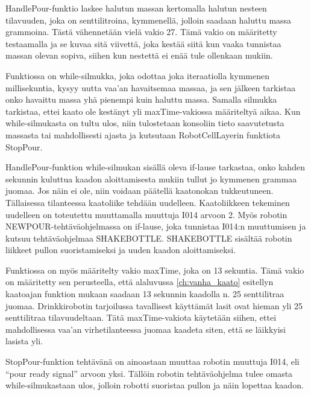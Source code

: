 HandlePour\hyp{}funktio laskee halutun massan kertomalla halutun nesteen tilavuuden, joka on senttilitroina, kymmenellä, jolloin saadaan haluttu massa grammoina. Tästä vähennetään vielä vakio 27. Tämä vakio on määritetty testaamalla ja se kuvaa sitä viivettä, joka kestää siitä kun vaaka tunnistaa massan olevan sopiva, siihen kun nestettä ei enää tule ollenkaan mukiin.

Funktiossa on while-silmukka, joka odottaa joka iteraatiolla kymmenen millisekuntia, kysyy uutta vaa'an havaitsemaa massaa, ja sen jälkeen tarkistaa onko havaittu massa yhä pienempi kuin haluttu massa. Samalla silmukka tarkistaa, ettei kaato ole kestänyt yli maxTime-vakiossa määriteltyä aikaa. Kun while-silmukasta on tultu ulos, niin tulostetaan konsoliin tieto saavutetusta massasta tai mahdollisesti ajasta ja kutsutaan RobotCellLayerin funktiota StopPour.

HandlePour-funktion while-silmukan sisällä oleva if-lause tarkastaa, onko kahden sekunnin kuluttua kaadon aloittamisesta mukiin tullut jo kymmenen grammaa juomaa. Jos näin ei ole, niin voidaan päätellä kaatonokan tukkeutuneen. Tällaisessa tilanteessa kaatoliike tehdään uudelleen. Kaatoliikkeen tekeminen uudelleen on toteutettu muuttamalla muuttuja I014 arvoon 2. Myös robotin NEWPOUR-tehtäväohjelmassa on if-lause, joka tunnistaa I014:n muuttumisen ja kutsuu tehtäväohjelmaa SHAKEBOTTLE. SHAKEBOTTLE sisältää robotin liikkeet pullon suoristamiseksi ja uuden kaadon aloittamiseksi.

Funktiossa on myös määritelty vakio maxTime, joka on 13 sekuntia. Tämä vakio on määritetty sen perusteella, että alaluvussa \ref{ch:vanha_kaato} esitellyn kaatoajan funktion mukaan saadaan 13 sekunnin kaadolla n. 25 senttilitraa juomaa. Drinkkirobotin tarjoilussa tavallisest käyttämät lasit ovat hieman yli 25 senttilitraa tilavuudeltaan. Tätä maxTime-vakiota käytetään siihen, ettei mahdollisessa vaa'an virhetilanteessa juomaa kaadeta siten, että se läikkyisi lasista yli.

StopPour-funktion tehtävänä on ainoastaan muuttaa robotin muuttuja I014, eli ``pour ready signal'' arvoon yksi. Tällöin robotin tehtäväohjelma tulee omasta while-silmukastaan ulos, jolloin robotti suoristaa pullon ja näin lopettaa kaadon.

\newpage

